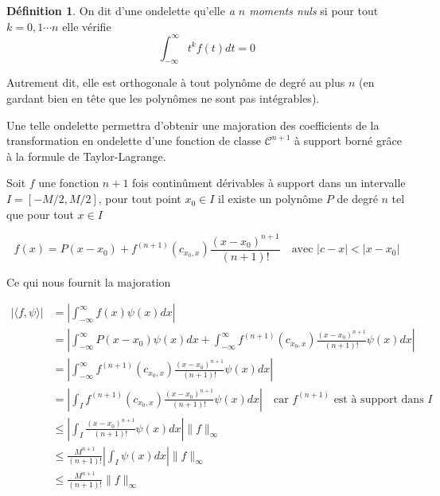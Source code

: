 \documentclass[]{article}
\theoremstyle{remark}
\theoremstyle{definition}
\newtheorem{mydef}{Définition}
\begin{document}
	\begin{mydef}
		On dit d'une ondelette qu'elle \textit{a $n$ moments nuls} si pour tout $k = 0, 1 \cdots n$ elle vérifie $$\int_{-\infty}^{\infty} t^k f(t) dt = 0$$
		
		Autrement dit, elle est orthogonale à tout polynôme de degré au plus $n$ (en gardant bien en tête que les polynômes ne sont pas intégrables).
	\end{mydef}
		
	Une telle ondelette permettra d'obtenir une majoration des coefficients de la transformation en ondelette d'une fonction de classe $\mathcal{C}^{n+1}$ à support borné grâce à la formule de Taylor-Lagrange.
	
	Soit $f$ une fonction $n+1$ fois continûment dérivables à support dans un intervalle $I = [-M/2, M/2]$, pour tout point $x_0 \in I$ il existe un polynôme $P$ de degré $n$ tel que pour tout $x \in I$ 
	
	$$f(x) = P(x - x_0) + f^{(n+1)}(c_{x_0, x}) \frac{(x-x_0)^{n+1}}{(n+1)!} \quad \text{avec } |c - x| < |x - x_0|$$
	
	Ce qui nous fournit la majoration
	
	\begin{align*}
		|\langle f, \psi \rangle| &= \left|\int_{-\infty}^{\infty} f(x) \psi(x) dx \right| \\
		&= \left| \int_{-\infty}^{\infty}P(x - x_0) \psi(x) dx + \int_{-\infty}^{\infty} f^{(n+1)}(c_{x_0, x}) \frac{(x-x_0)^{n+1}}{(n+1)!} \psi(x) dx  \right| \\
		&= \left| \int_{-\infty}^{\infty} f^{(n+1)}(c_{x_0, x}) \frac{(x-x_0)^{n+1}}{(n+1)!} \psi(x) dx  \right| \\
		&= \left| \int_{I} f^{(n+1)}(c_{x_0, x}) \frac{(x-x_0)^{n+1}}{(n+1)!} \psi(x) dx  \right| \quad \text{car $f^{(n+1)}$ est à support dans $I$} \\
		& \leqslant \left| \int_{I} \frac{(x-x_0)^{n+1}}{(n+1)!} \psi(x) dx \right| \|f\|_{\infty} \\
		& \leqslant \frac{M^{n+1}}{(n+1)!} \left| \int_{I} \psi(x) dx \right| \|f\|_{\infty} \\
		& \leqslant \frac{M^{n+1}}{(n+1)!} \|f\|_{\infty}
	\end{align*}
\end{document}
